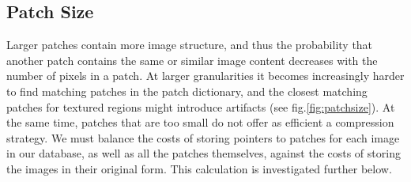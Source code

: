 

\newpage
\subsection{Patch Size}
\label{sec:patchsize}



Larger patches contain more image structure, and thus the probability that another patch contains the same or similar image content decreases with the number of pixels in a patch. At larger granularities it becomes increasingly harder to find matching patches in the patch dictionary, and the closest matching patches for textured regions might introduce artifacts (see fig.\ref{fig:patchsize}). At the same time, patches that are too small do not offer as efficient a compression strategy. We must balance the costs of storing pointers to patches for each image in our database, as well as all the patches themselves, against the costs of storing the images in their original form. This calculation is investigated further below.


